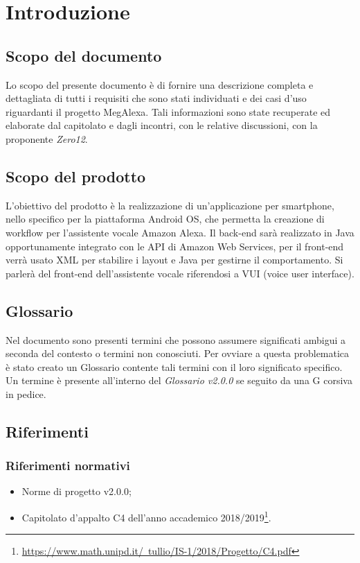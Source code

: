 \clearpage
\section{Introduzione}
\label{sec:intro}
\subsection{Scopo del documento}
Lo scopo del presente documento è di fornire una descrizione completa e dettagliata di tutti i requisiti che sono stati individuati e dei casi d'uso riguardanti il progetto MegAlexa.
Tali informazioni sono state recuperate ed elaborate dal capitolato e dagli incontri, con le relative discussioni, con la proponente \emph{Zero12}.
\subsection{Scopo del prodotto}
L'obiettivo del prodotto è la realizzazione di un'applicazione per smartphone, nello specifico per la piattaforma Android OS, che permetta la creazione di workflow per l'assistente vocale Amazon Alexa. Il back-end sarà realizzato in Java opportunamente integrato con le API di Amazon Web Services, per il front-end verrà usato XML per stabilire i layout e Java per gestirne il comportamento. Si parlerà del front-end dell'assistente vocale riferendosi a VUI (voice user interface).
\subsection{Glossario}
Nel documento sono presenti termini che possono assumere significati ambigui a seconda del contesto o termini non conosciuti. Per ovviare a questa problematica è stato creato un Glossario contente tali termini con il loro significato specifico. Un termine è presente all'interno del \emph{Glossario v2.0.0} se seguito da una G corsiva in pedice.
\subsection{Riferimenti}
\subsubsection{Riferimenti normativi}
\begin{itemize}
	\item Norme di progetto v2.0.0;
	\item Capitolato d’appalto C4 dell'anno accademico 2018/2019\footnote{\href{https://www.math.unipd.it/~tullio/IS-1/2018/Progetto/C4.pdf}{https://www.math.unipd.it/~tullio/IS-1/2018/Progetto/C4.pdf}}.
\end{itemize}
